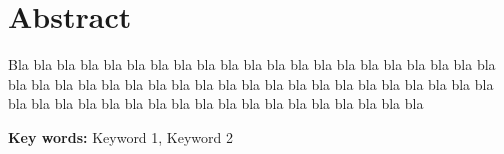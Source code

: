 \chapter*{Abstract}

{
\linespread{1.5}
\timesnewroman\xiaosi


Bla bla bla bla bla bla bla bla bla bla bla bla bla bla bla bla bla bla bla bla
bla bla bla bla bla bla bla bla bla bla bla bla bla bla bla bla bla bla bla bla
bla bla bla bla bla bla bla bla bla bla bla bla bla bla bla bla bla bla bla bla

\setlength{\parindent}{0em}
\textbf{Key words:} \; Keyword 1, \; Keyword 2 \par
}
